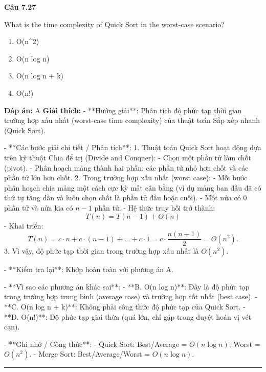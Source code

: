 \documentclass[11pt,a4paper]{article}
\newenvironment{question}[1]{%
  \par\vspace{1em}\noindent\textbf{\large Câu #1}\par\vspace{0.4em}
}{%
  \par\vspace{1em}\hrule\vspace{0.6em}
}
\newenvironment{choices}{%
  \begin{enumerate}[label=\textbf{\Alph*.},leftmargin=2.2em,itemsep=2pt,topsep=3pt]
}{%
  \end{enumerate}
}
\newcommand{\choice}{\item}
\begin{document}
\begin{question}{7.27}
What is the time complexity of Quick Sort in the worst-case scenario?
\begin{choices}
\choice O(n^2)
\choice O(n log n)
\choice O(n log n + k)
\choice O(n!)
\end{choices}
\textbf{Đáp án:} A
\textbf{Giải thích:} - **Hướng giải**:
  Phân tích độ phức tạp thời gian trường hợp xấu nhất (worst-case time complexity) của thuật toán Sắp xếp nhanh (Quick Sort).

- **Các bước giải chi tiết / Phân tích**:
  1. Thuật toán Quick Sort hoạt động dựa trên kỹ thuật Chia để trị (Divide and Conquer):
     - Chọn một phần tử làm chốt (pivot).
     - Phân hoạch mảng thành hai phần: các phần tử nhỏ hơn chốt và các phần tử lớn hơn chốt.
  2. Trong trường hợp xấu nhất (worst case):
     - Mỗi bước phân hoạch chia mảng một cách cực kỳ mất cân bằng (ví dụ mảng ban đầu đã có thứ tự tăng dần và luôn chọn chốt là phần tử đầu hoặc cuối).
     - Một nửa có \(0\) phần tử và nửa kia có \(n - 1\) phần tử.
     - Hệ thức truy hồi trở thành:
       \[ T(n) = T(n - 1) + O(n) \]
     - Khai triển:
       \[ T(n) = c \cdot n + c \cdot (n - 1) + \dots + c \cdot 1 = c \cdot \frac{n(n + 1)}{2} = O(n^2). \]
  3. Vì vậy, độ phức tạp thời gian trong trường hợp xấu nhất là \(O(n^2)\).

- **Kiểm tra lại**:
  Khớp hoàn toàn với phương án A.

- **Vì sao các phương án khác sai**:
  - **B. O(n log n)**: Đây là độ phức tạp trong trường hợp trung bình (average case) và trường hợp tốt nhất (best case).
  - **C. O(n log n + k)**: Không phải công thức độ phức tạp của Quick Sort.
  - **D. O(n!)**: Độ phức tạp giai thừa (quá lớn, chỉ gặp trong duyệt hoán vị vét cạn).

- **Ghi nhớ / Công thức**:
  - Quick Sort: Best/Average = \(O(n \log n)\); Worst = \(O(n^2)\).
  - Merge Sort: Best/Average/Worst = \(O(n \log n)\).
\end{question}
\end{document}
